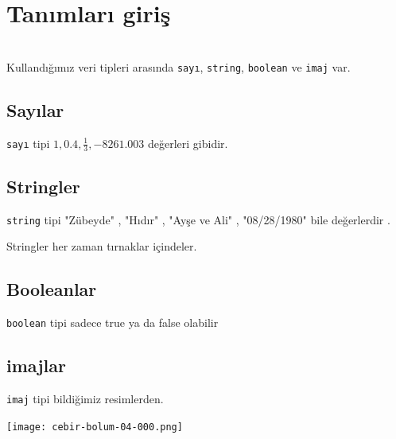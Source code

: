 \documentclass[12pt, a4paper]{article}
\begin{document}
\section*{Tanımları giriş}
\\
Kullandığımız veri tipleri arasında \texttt{sayı}, \texttt{string}, \texttt{boolean} ve \texttt{imaj} var.


\subsection*{Sayılar} 
\texttt{sayı} tipi 
$ 1 , 0.4 , \frac{1}{3} , -8261.003 $ değerleri gibidir.

\subsection*{Stringler}
\texttt{string} tipi "Zübeyde" , "Hıdır" , "Ayşe ve Ali" ,  "08/28/1980" bile değerlerdir .

Stringler her zaman tırnaklar içindeler.

\subsection*{Booleanlar}
\texttt{boolean} tipi sadece true ya da false olabilir

\subsection*{imajlar}
\texttt{imaj} tipi bildiğimiz resimlerden. 





\newpage
\texttt{[image: cebir-bolum-04-000.png]}
\end{document}
